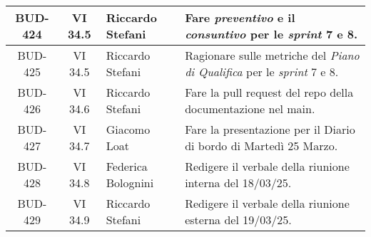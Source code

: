 \begin{table}[htbp]
\begin{tabular}{|c|c|p{}|p{}|}
    \hline
    BUD-424 & VI 34.5 & Riccardo Stefani & Fare \emph{preventivo} e il \emph{consuntivo} per le \emph{sprint} 7 e 8. \\
    \hline
    BUD-425 & VI 34.5 & Riccardo Stefani & Ragionare sulle metriche del \emph{Piano di Qualifica} per le \emph{sprint} 7 e 8.\\
    \hline
    BUD-426 & VI 34.6 & Riccardo Stefani & Fare la pull request del repo della documentazione nel main. \\
    \hline
    BUD-427 & VI 34.7 & Giacomo Loat & Fare la presentazione per il Diario di bordo di Martedì 25 Marzo. \\
    \hline
    BUD-428 & VI 34.8 & Federica Bolognini & Redigere il verbale della riunione interna del 18/03/25.  \\
    \hline
    BUD-429 & VI 34.9 & Riccardo Stefani & Redigere il verbale della riunione esterna del 19/03/25.  \\
    \hline
\end{tabular}
\end{table}
